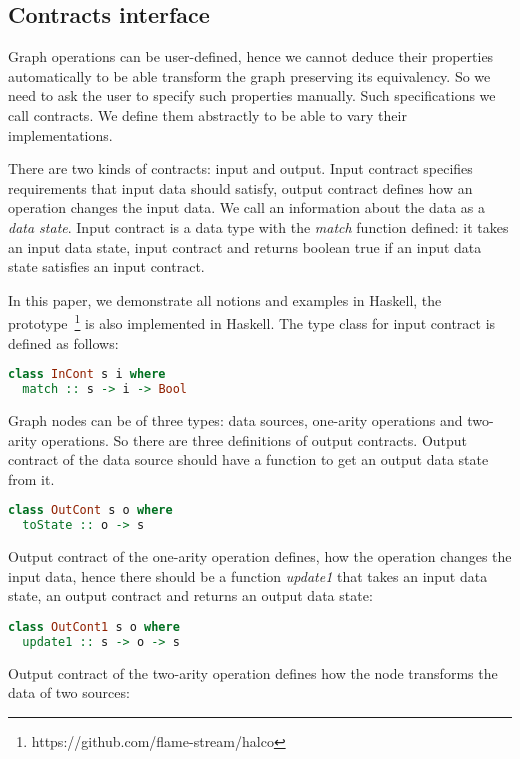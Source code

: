 \subsection{Contracts interface}

Graph operations can be user-defined, hence we cannot deduce their properties automatically to be able transform the graph preserving its equivalency.
So we need to ask the user to specify such properties manually.
Such specifications we call contracts.
We define them abstractly to be able to vary their implementations.

There are two kinds of contracts: input and output.
Input contract specifies requirements that input data should satisfy, output contract defines how an operation changes the input data.
We call an information about the data as a {\em data state}.
Input contract is a data type with the {\em match} function defined: it takes an input data state, input contract and returns boolean true if an input data state satisfies an input contract.

In this paper, we demonstrate all notions and examples in Haskell, the prototype~\footnote{https://github.com/flame-stream/halco} is also implemented in Haskell. The type class for input contract is defined as follows:

\begin{lstlisting}[language=Haskell]
class InCont s i where
  match :: s -> i -> Bool
\end{lstlisting}

Graph nodes can be of three types: data sources, one-arity operations and two-arity operations.
So there are three definitions of output contracts.
Output contract of the data source should have a function to get an output data state from it.

\begin{lstlisting}[language=Haskell]
class OutCont s o where
  toState :: o -> s
\end{lstlisting}

Output contract of the one-arity operation defines, how the operation changes the input data, hence there should be a function {\em update1} that takes an input data state, an output contract and returns an output data state:

\begin{lstlisting}[language=Haskell]
class OutCont1 s o where
  update1 :: s -> o -> s
\end{lstlisting}

Output contract of the two-arity operation defines how the node transforms the data of two sources:

